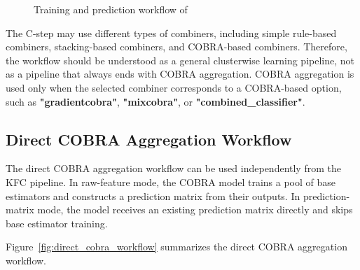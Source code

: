 \begin{figure}[H]
      \caption{Training and prediction workflow of \KFCProcedure{}}
      \label{fig:kfc_training_prediction_workflow}
\end{figure}

The C-step may use different types of combiners, including simple rule-based combiners, stacking-based combiners, and COBRA-based combiners. Therefore, the \KFCProcedure{} workflow should be understood as a general clusterwise learning pipeline, not as a pipeline that always ends with COBRA aggregation. COBRA aggregation is used only when the selected combiner corresponds to a COBRA-based option, such as \textbf{"gradientcobra"}, \textbf{"mixcobra"}, or \textbf{"combined\_classifier"}.

\subsection{Direct COBRA Aggregation Workflow}

\hs The direct COBRA aggregation workflow can be used independently from the KFC pipeline. In raw-feature mode, the COBRA model trains a pool of base estimators and constructs a prediction matrix from their outputs. In prediction-matrix mode, the model receives an existing prediction matrix directly and skips base estimator training.

Figure~\ref{fig:direct_cobra_workflow} summarizes the direct COBRA aggregation workflow.

